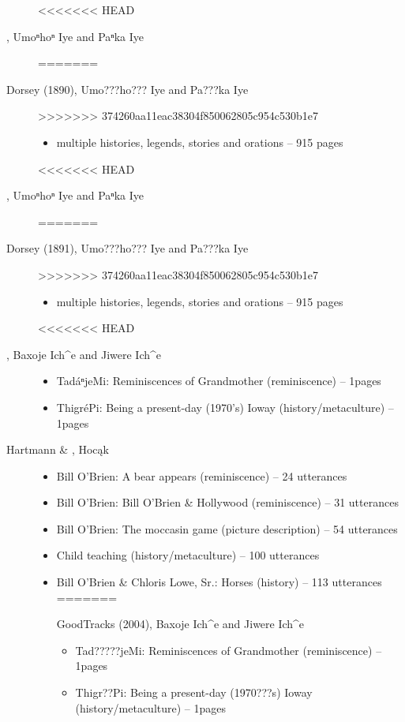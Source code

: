\documentclass[output=paper]{LSP/langsci}
\begin{document}
\begin{description}
<<<<<<< HEAD
\item[\citet{Dorsey1890}, Umoⁿhoⁿ Iye and Paⁿka Iye]\hfill
=======
\item[Dorsey (1890), Umo???ho??? Iye and Pa???ka Iye]\hfill
>>>>>>> 374260aa11eac38304f850062805c954c530b1e7
\begin{itemize}
\item multiple histories, legends, stories and orations -- 915 pages
\end{itemize}

<<<<<<< HEAD
\item[\citet{Dorsey1891}, Umoⁿhoⁿ Iye and Paⁿka Iye]\hfill
=======
\item[Dorsey (1891), Umo???ho??? Iye and Pa???ka Iye]\hfill
>>>>>>> 374260aa11eac38304f850062805c954c530b1e7
\begin{itemize}
\item multiple histories, legends, stories and orations -- 915 pages
\end{itemize}

<<<<<<< HEAD
\item[\citet{GoodTracks2004}, Baxoje Ich\^{}e and Jiwere Ich\^{}e]\hfill
\begin{itemize}
\item TadáⁿjeMi: Reminiscences of Grandmother (reminiscence) -- 1\textonehalf{}pages
\item ThigréPi: Being a present-day (1970’s) Ioway (history/metaculture) -- 1\textonehalf{}pages
\end{itemize}

\item[Hartmann \& \citet{Marschke2010}, Hocąk]\hfill
\begin{itemize}
\item Bill O’Brien: A bear appears (reminiscence) -- 24 utterances
\item Bill O’Brien: Bill O’Brien \& Hollywood (reminiscence) -- 31 utterances
\item Bill O’Brien: The moccasin game (picture description) -- 54 utterances
\item Child teaching (history/metaculture) -- 100 utterances
\item Bill O’Brien \& Chloris Lowe, Sr.: Horses (history) -- 113 utterances
=======
\item[GoodTracks (2004), Baxoje Ich\^{}e and Jiwere Ich\^{}e]\hfill
\begin{itemize}
\item Tad?????jeMi: Reminiscences of Grandmother (reminiscence) -- 1\textonehalf{}pages
\item Thigr??Pi: Being a present-day (1970???s) Ioway (history/metaculture) -- 1\textonehalf{}pages
\end{itemize}


\end{itemize}
\end{description}
\end{document}
